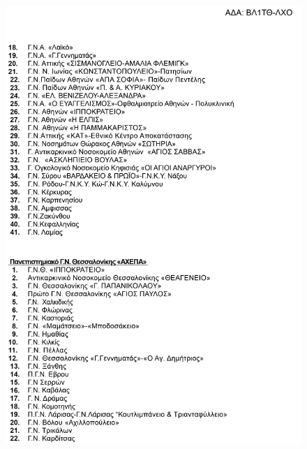 	\begin{figure}[H]
	    \centering
	    \includegraphics[width=1\textwidth]{blood_centers_2.png}
	\end{figure}

